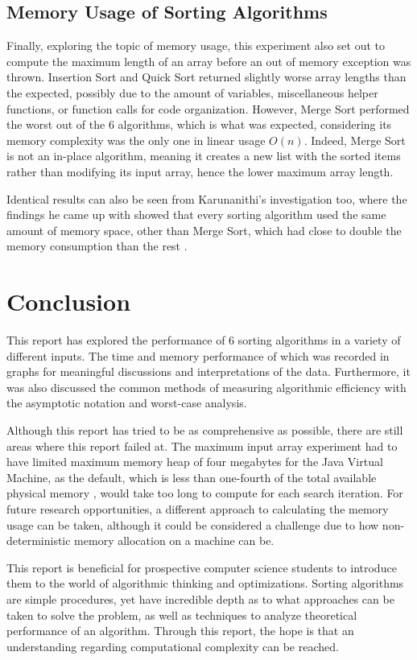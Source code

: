 \documentclass{report}
\begin{document}
\subsection{Memory Usage of Sorting Algorithms}
Finally, exploring the topic of memory usage, this experiment also set out to compute the maximum length of an array before an out of memory exception was thrown. Insertion Sort and Quick Sort returned slightly worse array lengths than the expected, possibly due to the amount of variables, miscellaneous helper functions, or function calls for code organization. However, Merge Sort performed the worst out of the 6 algorithms, which is what was expected, considering its memory complexity was the only one in linear usage $O(n)$. Indeed, Merge Sort is not an in-place algorithm, meaning it creates a new list with the sorted items rather than modifying its input array, hence the lower maximum array length.

Identical results can also be seen from Karunanithi's investigation too, where the findings he came up with showed that every sorting algorithm used the same amount of memory space, other than Merge Sort, which had close to double the memory consumption than the rest \autocite{karunanithi2014survey}.

\section{Conclusion}
This report has explored the performance of 6 sorting algorithms in a variety of different inputs. The time and memory performance of which was recorded in graphs for meaningful discussions and interpretations of the data. Furthermore, it was also discussed the common methods of measuring algorithmic efficiency with the asymptotic notation and worst-case analysis.

Although this report has tried to be as comprehensive as possible, there are still areas where this report failed at. The maximum input array experiment had to have limited maximum memory heap of four megabytes for the Java Virtual Machine, as the default, which is less than one-fourth of the total available physical memory \autocite{ParallelCollector}, would take too long to compute for each search iteration. For future research opportunities, a different approach to calculating the memory usage can be taken, although it could be considered a challenge due to how non-deterministic memory allocation on a machine can be.

This report is beneficial for prospective computer science students to introduce them to the world of algorithmic thinking and optimizations. Sorting algorithms are simple procedures, yet have incredible depth as to what approaches can be taken to solve the problem, as well as techniques to analyze theoretical performance of an algorithm. Through this report, the hope is that an understanding regarding computational complexity can be reached.

\printbibliography
\end{document}
